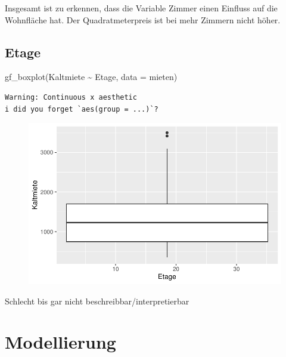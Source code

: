 \documentclass[
  a4paper,
  DIV=11]{scrartcl}
\newenvironment{Shaded}{\begin{snugshade}}{\end{snugshade}}
\newcommand{\AttributeTok}[1]{\textcolor[rgb]{0.40,0.45,0.13}{#1}}
\newcommand{\FunctionTok}[1]{\textcolor[rgb]{0.28,0.35,0.67}{#1}}
\newcommand{\NormalTok}[1]{\textcolor[rgb]{0.00,0.23,0.31}{#1}}
\newcommand{\SpecialCharTok}[1]{\textcolor[rgb]{0.37,0.37,0.37}{#1}}
\begin{document}
Insgesamt ist zu erkennen, dass die Variable Zimmer einen Einfluss auf
die Wohnfläche hat. Der Quadratmeterpreis ist bei mehr Zimmern nicht
höher.

\hypertarget{etage}{%
\subsection{Etage}\label{etage}}

\begin{Shaded}
\begin{Highlighting}[]
\FunctionTok{gf\_boxplot}\NormalTok{(Kaltmiete }\SpecialCharTok{\textasciitilde{}}\NormalTok{ Etage, }\AttributeTok{data =}\NormalTok{ mieten)}
\end{Highlighting}
\end{Shaded}

\begin{verbatim}
Warning: Continuous x aesthetic
i did you forget `aes(group = ...)`?
\end{verbatim}

\begin{figure}[H]

{\centering \includegraphics{Mietmodellierung_files/figure-pdf/unnamed-chunk-15-1.pdf}

}

\end{figure}

Schlecht bis gar nicht beschreibbar/interpretierbar

\hypertarget{modellierung}{%
\section{Modellierung}\label{modellierung}}
\end{document}
